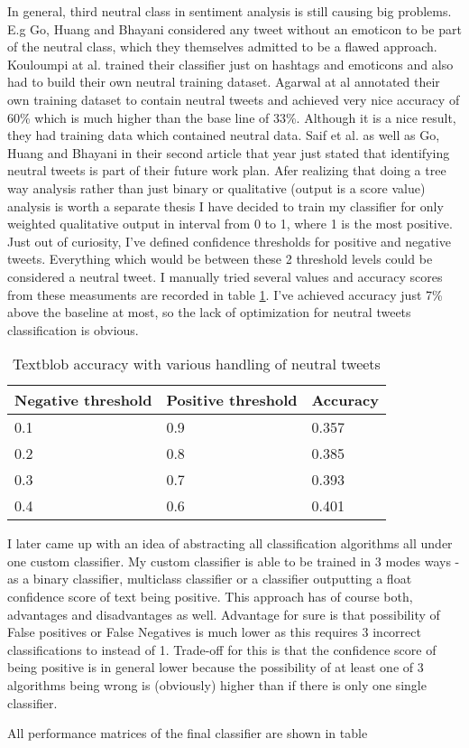 In general, third neutral class in sentiment analysis is still causing big problems. E.g Go, Huang and Bhayani \cite{go2009twitter2} considered any tweet without an emoticon to be part of the neutral class, which they themselves admitted to be a flawed approach. Kouloumpi at al. \cite{kouloumpis2011twitter} trained their classifier just on hashtags and emoticons and also had to build their own neutral training dataset.  Agarwal at al \cite{agarwal2011sentiment} annotated their own training dataset to contain neutral tweets and achieved very nice accuracy of 60\% which is much higher than the base line of 33\%. Although it is a nice result, they had training data which contained neutral data. Saif et al. \cite{saif2012semantic} as well as Go, Huang and Bhayani \cite{go2009twitter} in their second article that year just stated that identifying neutral tweets is part of their future work plan.  Afer realizing that doing a tree way analysis rather than just binary or qualitative (output is a score value) analysis is worth a separate thesis I have decided to train my classifier for only weighted qualitative output in interval from 0 to 1, where 1 is the most positive. Just out of curiosity, I've     defined confidence thresholds for positive and negative tweets. Everything which would be between these 2 threshold levels could be considered a neutral tweet. I manually tried several values and accuracy scores from these measuments are recorded in table \ref{table:negativeAccuracy}. I've achieved accuracy just 7\% above the baseline at most, so the lack of optimization for neutral tweets classification is obvious.


\begin{table}[H]
\centering
\begin{tabular}{|p{4cm}|p{4cm}|p{3cm}|}
 \hline
\textbf{ Negative threshold }& \textbf{Positive threshold} & \textbf{Accuracy}\\
 \hline
 0.1 & 0.9 & 0.357\\ \hline
 0.2 & 0.8 & 0.385\\ \hline
 0.3 & 0.7 & 0.393\\ \hline 
 0.4 & 0.6 & 0.401\\ \hline 
\end{tabular}
\caption{Textblob accuracy with various handling of neutral tweets}
\label{table:negativeAccuracy}
\end{table}

I later came up with an idea of abstracting all classification algorithms all under one custom classifier. My custom classifier is able to be trained in 3 modes ways - as a binary classifier, multiclass classifier or a classifier outputting a float confidence score of text being positive.
This approach has of course both, advantages and disadvantages as well. Advantage for sure is that possibility of False positives or False Negatives is much lower as this requires 3 incorrect classifications to instead of 1. Trade-off for this is that the confidence score of being positive is in general lower because the possibility of at least one of 3 algorithms being wrong is (obviously) higher than if there is only one single classifier.

All performance matrices of the final classifier are shown in table 
	
